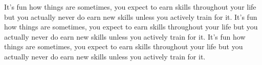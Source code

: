 \documentclass{twocolumn}
\begin{document}
It's fun how things are sometimes, you expect to earn skills throughout your life
but you actually never do earn new skills unless you actively train for it.
\twocolumn
It's fun how things are sometimes, you expect to earn skills throughout your life
but you actually never do earn new skills unless you actively train for it.
\onecolumn
It's fun how things are sometimes, you expect to earn skills throughout your life
but you actually never do earn new skills unless you actively train for it.
\end{document}
